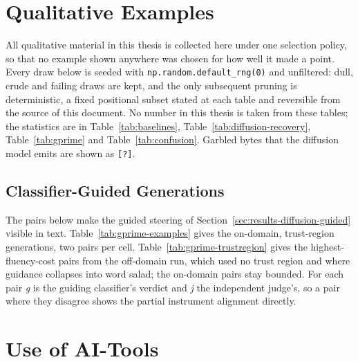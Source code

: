\clearpage
\section{Qualitative Examples}
\label{app:gprime-examples}
\label{app:showcase}

All qualitative material in this thesis is collected here under one selection policy, so that no example shown anywhere was chosen for how well it made a point. Every draw below is seeded with \texttt{np.random.default\_rng(0)} and unfiltered: dull, crude and failing draws are kept, and the only subsequent pruning is deterministic, a fixed positional subset stated at each table and reversible from the source of this document. No number in this thesis is taken from these tables; the statistics are in Table~\ref{tab:baselines}, Table~\ref{tab:diffusion-recovery}, Table~\ref{tab:gprime} and Table~\ref{tab:confusion}. Garbled bytes that the diffusion model emits are shown as \texttt{[?]}.


\subsection{Classifier-Guided Generations}
\label{app:examples-guided}
The pairs below make the guided steering of Section~\ref{sec:results-diffusion-guided} visible in text. Table~\ref{tab:gprime-examples} gives the on-domain, trust-region generations, two pairs per cell. Table~\ref{tab:gprime-trustregion} gives the highest-fluency-cost pairs from the off-domain run, which used no trust region and where guidance collapses into word salad; the on-domain pairs stay bounded. For each pair \emph{g} is the guiding classifier's verdict and \emph{j} the independent judge's, so a pair where they disagree shows the partial instrument alignment directly.


\clearpage


\clearpage
\section{Use of AI-Tools}
\label{app:ai-tools}

